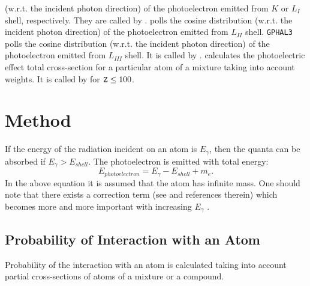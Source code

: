 (w.r.t. the incident photon direction) of the photoelectron emitted from 
$K$ or $L_{I}$ shell, respectively. They are called by .
 polls the cosine distribution (w.r.t. the incident photon
direction) of the photoelectron emitted from $L_{II}$ shell.
{\tt GPHAL3} polls the cosine distribution (w.r.t. the incident photon
direction) of the photoelectron emitted from $L_{III}$ shell.
It is called by .
 calculates the photoelectric effect total cross-section for
a particular atom of a mixture taking into account weights. It is called by 
 for ${\tt Z} \leq  100$.
 
\section{Method}
 
If the energy of the radiation incident on an atom is $E_{\gamma}$, then
the quanta can be absorbed if $E_{\gamma} > E_{shell}$.
The photoelectron is emitted with total energy:
\begin{equation}
E_{photoelectron} = E_{\gamma}-E_{shell}+m_e.
\end{equation}
In the above equation it is assumed that the atom has infinite mass. One should
note that there exists a correction term (see \cite{bib-BETHE} and
references therein) which becomes more and more important with
increasing $E_{\gamma}$ \cite{bib-HALL} \cite{bib-PRATT} \cite{bib-PRATT1}.

\subsection{Probability of Interaction with an Atom}
Probability of the interaction with an atom is calculated taking into
account partial cross-sections of atoms of a mixture
or a compound.
